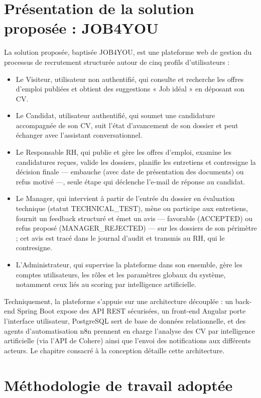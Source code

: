\section{Présentation de la solution proposée : JOB4YOU}
\label{sec_1_6}
La solution proposée, baptisée JOB4YOU, est une plateforme web de gestion du processus de recrutement structurée autour de cinq profils d’utilisateurs :

\begin{itemize}
\item Le Visiteur, utilisateur non authentifié, qui consulte et recherche les offres d’emploi publiées et obtient des suggestions « Job idéal » en déposant son CV.
\item Le Candidat, utilisateur authentifié, qui soumet une candidature accompagnée de son CV, suit l’état d’avancement de son dossier et peut échanger avec l’assistant conversationnel.
\item Le Responsable RH, qui publie et gère les offres d’emploi, examine les candidatures reçues, valide les dossiers, planifie les entretiens et contresigne la décision finale — embauche (avec date de présentation des documents) ou refus motivé —, seule étape qui déclenche l’e-mail de réponse au candidat.
\item Le Manager, qui intervient à partir de l’entrée du dossier en évaluation technique (statut TECHNICAL\_TEST), mène ou participe aux entretiens, fournit un feedback structuré et émet un avis — favorable (ACCEPTED) ou refus proposé (MANAGER\_REJECTED) — sur les dossiers de son périmètre ; cet avis est tracé dans le journal d’audit et transmis au RH, qui le contresigne.
\item L’Administrateur, qui supervise la plateforme dans son ensemble, gère les comptes utilisateurs, les rôles et les paramètres globaux du système, notamment ceux liés au scoring par intelligence artificielle.
\end{itemize}

Techniquement, la plateforme s’appuie sur une architecture découplée : un back-end Spring Boot expose des API REST sécurisées, un front-end Angular porte l’interface utilisateur, PostgreSQL sert de base de données relationnelle, et des agents d’automatisation n8n prennent en charge l’analyse des CV par intelligence artificielle (via l’API de Cohere) ainsi que l’envoi des notifications aux différents acteurs. Le chapitre consacré à la conception détaille cette architecture.

\section{Méthodologie de travail adoptée}
\label{sec_1_7}
